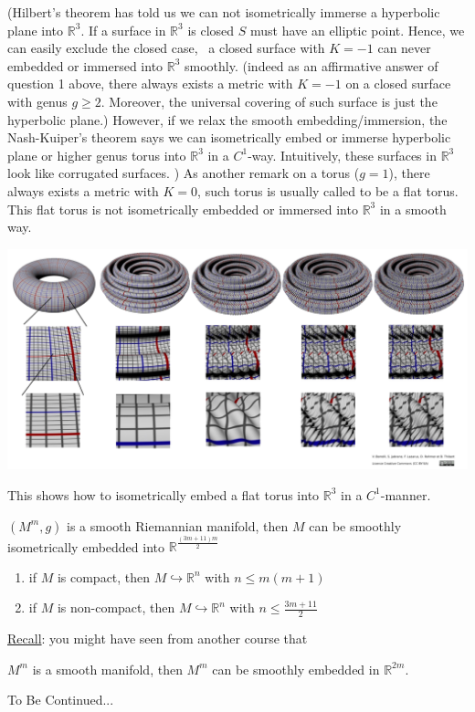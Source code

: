 \begin{enumerate}
    (Hilbert's theorem has told us we can not isometrically immerse 
    a hyperbolic plane into \(\mathbb{R}^3\). If a surface in \(\mathbb{R}^3\)
    is closed \(S\) must have an elliptic point. Hence, 
    we can easily exclude the closed case, \ie\ a closed surface with \(K=-1\)
    can never embedded or immersed into \(\mathbb{R}^3\) smoothly. 
    (indeed as an affirmative answer of question 1 above, there always exists
    a metric with \(K=-1\) on a closed surface with genus \(g\ge 2\). 
    Moreover, the universal covering of such surface is just the hyperbolic
    plane.)
    However, if we relax the smooth embedding/immersion, the Nash-Kuiper's 
    theorem says we can isometrically embed or immerse hyperbolic plane
    or higher genus torus into \(\mathbb{R}^3\) in a \(C^1\)-way. Intuitively,
    these surfaces in \(\mathbb{R}^3\) look like corrugated surfaces.
    )
    As another remark on a torus (\(g=1\)), there always exists a metric
    with \(K=0\), such torus is usually called to be a flat torus. This flat
    torus is not isometrically embedded or immersed into \(\mathbb{R}^3\) in
    a smooth way.
    \begin{center}
        \includegraphics[scale=0.3]{picture/final remark/corrugated.png}
    \end{center}
    This shows how to isometrically embed a flat torus into \(\mathbb{R}^3\)
    in a \(C^1\)-manner.
    \begin{theorem}
        \((M^m,g)\) is a smooth Riemannian manifold, then \(M\) can 
        be smoothly isometrically embedded into \(\mathbb{R}^{
            \frac{(3m+11)m}{2}
        }\)
        \begin{enumerate}[(1)]
            \item if \(M\) is compact, then 
            \(M\hookrightarrow \mathbb{R}^n\) with 
            \(n\le m(m+1)\)
            \item if \(M\) is non-compact, then \(M 
            \hookrightarrow \mathbb{R}^n\) with 
            \(n\le \frac{3m+11}{2}\)
        \end{enumerate}
    \end{theorem}
    \underline{Recall}: you might have seen from another course
    that 
    \begin{theorem}
        \(M^m\) is a smooth manifold, then \(M^m\) can be smoothly embedded in
        \(\mathbb{R}^{2m}\).
    \end{theorem}
\end{enumerate}
\vspace{4cm}
\begin{center}
    {\Huge To Be Continued...}    
\end{center}
